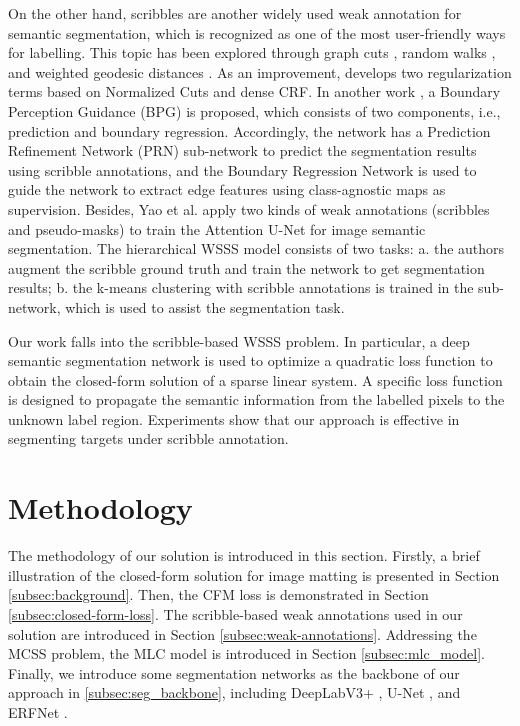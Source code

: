 \documentclass[journal]{IEEEtran}
\begin{document}
On the other hand, scribbles are another widely used weak annotation for semantic segmentation, which is recognized as one of the most user-friendly ways for labelling. This topic has been explored through graph cuts \cite{boykov2001interactive}, random walks \cite{grady2006random}, and weighted geodesic distances \cite{bai2009geodesic}. As an improvement, \cite{tang2018regularized} develops two regularization terms based on Normalized Cuts and dense CRF. In another work \cite{wang2019boundary}, a Boundary Perception Guidance (BPG) is proposed, which consists of two components, i.e., prediction and boundary regression. Accordingly, the network has a Prediction Refinement Network (PRN) sub-network to predict the segmentation results using scribble annotations, and the Boundary Regression Network is used to guide the network to extract edge features using class-agnostic maps as supervision. Besides, Yao et al. \cite{yao2021weakly} apply two kinds of weak annotations (scribbles and pseudo-masks) to train the Attention U-Net \cite{oktay2018attention} for image semantic segmentation. The hierarchical WSSS model consists of two tasks: a. the authors augment the scribble ground truth and train the network to get segmentation results; b. the k-means clustering with scribble annotations is trained in the sub-network, which is used to assist the segmentation task. 

Our work falls into the scribble-based WSSS problem. In particular, a deep semantic segmentation network is used to optimize a quadratic loss function to obtain the closed-form solution of a sparse linear system. A specific loss function is designed to propagate the semantic information from the labelled pixels to the unknown label region. Experiments show that our approach is effective in segmenting targets under scribble annotation. 


\section{Methodology}
\label{method}
The methodology of our solution is introduced in this section. Firstly, a brief illustration of the closed-form solution for image matting \cite{levin2007closed} is presented in Section \ref{subsec:background}. Then, the CFM loss is demonstrated in Section \ref{subsec:closed-form-loss}. The scribble-based weak annotations used in our solution are introduced in Section \ref{subsec:weak-annotations}. Addressing the MCSS problem, the MLC model is introduced in Section \ref{subsec:mlc_model}. Finally, we introduce some segmentation networks as the backbone of our approach in \ref{subsec:seg_backbone}, including DeepLabV3+ \cite{chen2018encoder}, U-Net \cite{ronneberger2015u}, and ERFNet \cite{romera2017erfnet}.
\end{document}
